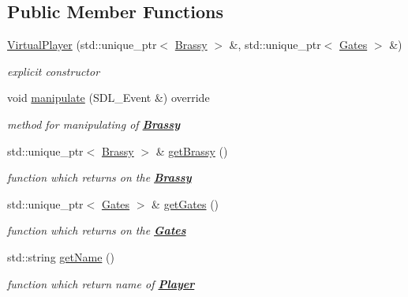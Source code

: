 \subsection*{Public Member Functions}
\begin{DoxyCompactItemize}
\item 
\mbox{\label{class_virtual_player_a204c74ad50a23fc0313ca75167f5cc0e}} 
\mbox{\hyperlink{class_virtual_player_a204c74ad50a23fc0313ca75167f5cc0e}{Virtual\+Player}} (std\+::unique\+\_\+ptr$<$ \mbox{\hyperlink{class_brassy}{Brassy}} $>$ \&, std\+::unique\+\_\+ptr$<$ \mbox{\hyperlink{class_gates}{Gates}} $>$ \&)
\begin{DoxyCompactList}\small\item\em explicit {\itshape constructor} \end{DoxyCompactList}\item 
\mbox{\label{class_virtual_player_ae7fedfec96b2dfa9dd896781c9cdf1a6}} 
void \mbox{\hyperlink{class_virtual_player_ae7fedfec96b2dfa9dd896781c9cdf1a6}{manipulate}} (S\+D\+L\+\_\+\+Event \&) override
\begin{DoxyCompactList}\small\item\em {\itshape method} for manipulating of {\bfseries{\mbox{\hyperlink{class_brassy}{Brassy}}}} \end{DoxyCompactList}\item 
\mbox{\label{class_virtual_player_a198f8616a971d7754b845da3c626e8cf}} 
std\+::unique\+\_\+ptr$<$ \mbox{\hyperlink{class_brassy}{Brassy}} $>$ \& \mbox{\hyperlink{class_virtual_player_a198f8616a971d7754b845da3c626e8cf}{get\+Brassy}} ()
\begin{DoxyCompactList}\small\item\em {\itshape function} which returns {\itshape on} the {\bfseries{\mbox{\hyperlink{class_brassy}{Brassy}}}} \end{DoxyCompactList}\item 
\mbox{\label{class_virtual_player_a4c7065491aa57fcba922ad24b4b46211}} 
std\+::unique\+\_\+ptr$<$ \mbox{\hyperlink{class_gates}{Gates}} $>$ \& \mbox{\hyperlink{class_virtual_player_a4c7065491aa57fcba922ad24b4b46211}{get\+Gates}} ()
\begin{DoxyCompactList}\small\item\em {\itshape function} which returns {\itshape on} the {\bfseries{\mbox{\hyperlink{class_gates}{Gates}}}} \end{DoxyCompactList}\item 
\mbox{\label{class_virtual_player_a44db5e9031534f78a910e6bf8b230535}} 
std\+::string \mbox{\hyperlink{class_virtual_player_a44db5e9031534f78a910e6bf8b230535}{get\+Name}} ()
\begin{DoxyCompactList}\small\item\em {\itshape function} which return {\itshape name} of {\bfseries{\mbox{\hyperlink{class_player}{Player}}}} \end{DoxyCompactList}\end{DoxyCompactItemize}
